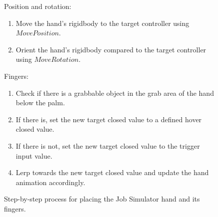 \begin{figure}[H]
\centering
\small
Position and rotation:
\begin{enumerate}[noitemsep]
\item Move the hand's rigidbody to the target controller using $MovePosition$.
\item Orient the hand's rigidbody compared to the target controller using $MoveRotation$.
\end{enumerate}
Fingers:
\begin{enumerate}[noitemsep]
\item Check if there is a grabbable object in the grab area of the hand below the palm.
\item If there is, set the new target closed value to a defined hover closed value.
\item If there is not, set the new target closed value to the trigger input value.
\item Lerp towards the new target closed value and update the hand animation accordingly.
\end{enumerate}
\caption{Step-by-step process for placing the Job Simulator hand and its fingers.}
\label{fig:stepByStepJobSimHand}
\end{figure}

